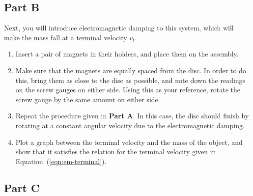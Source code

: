 

\subsection*{Part B}

Next, you will introduce electromagnetic damping to this system, which will make the mass fall at a terminal velocity $v_t$.
\begin{enumerate}
    \item Insert a pair of magnets in their holders, and place them on the assembly.
    
    \item Make sure that the magnets are equally spaced from the disc. In order to do this, bring them as close to the disc as possible, and note down the readings on the screw gauges on either side. Using this as your reference, rotate the screw gauge by the same amount on either side.
    
    \item Repeat the procedure given in \textbf{Part A}. In this case, the disc should finish by rotating at a constant angular velocity due to the electromagnetic damping.
    
    \item Plot a graph between the terminal velocity and the mass of the object, and show that it satisfies the relation for the terminal velocity given in Equation~(\ref{eqn:em-terminal}).
    
\end{enumerate}

\subsection*{Part C}

